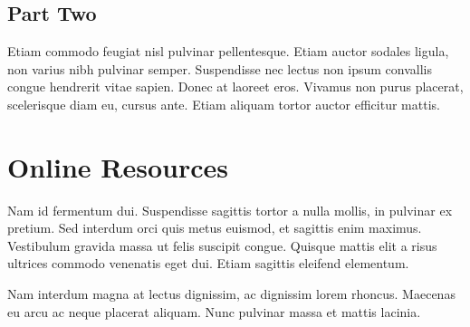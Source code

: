 \documentclass[acmtog, authorversion]{acmart}
\begin{document}
\subsection{Part Two}

Etiam commodo feugiat nisl pulvinar pellentesque. Etiam auctor sodales
ligula, non varius nibh pulvinar semper. Suspendisse nec lectus non
ipsum convallis congue hendrerit vitae sapien. Donec at laoreet
eros. Vivamus non purus placerat, scelerisque diam eu, cursus
ante. Etiam aliquam tortor auctor efficitur mattis.

\section{Online Resources}

Nam id fermentum dui. Suspendisse sagittis tortor a nulla mollis, in
pulvinar ex pretium. Sed interdum orci quis metus euismod, et sagittis
enim maximus. Vestibulum gravida massa ut felis suscipit
congue. Quisque mattis elit a risus ultrices commodo venenatis eget
dui. Etiam sagittis eleifend elementum.

Nam interdum magna at lectus dignissim, ac dignissim lorem
rhoncus. Maecenas eu arcu ac neque placerat aliquam. Nunc pulvinar
massa et mattis lacinia.
\end{document}
